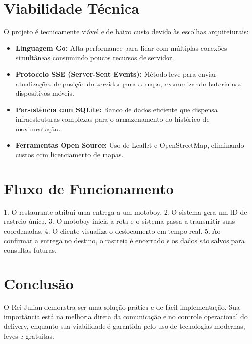 \documentclass[12pt,a4paper]{article}
\begin{document}
\section{Viabilidade Técnica}
O projeto é tecnicamente viável e de baixo custo devido às escolhas arquiteturais:
\begin{itemize}
    \item \textbf{Linguagem Go:} Alta performance para lidar com múltiplas conexões simultâneas consumindo poucos recursos de servidor.
    \item \textbf{Protocolo SSE (Server-Sent Events):} Método leve para enviar atualizações de posição do servidor para o mapa, economizando bateria nos dispositivos móveis.
    \item \textbf{Persistência com SQLite:} Banco de dados eficiente que dispensa infraestruturas complexas para o armazenamento do histórico de movimentação.
    \item \textbf{Ferramentas Open Source:} Uso de Leaflet e OpenStreetMap, eliminando custos com licenciamento de mapas.
\end{itemize}

\section{Fluxo de Funcionamento}
1. O restaurante atribui uma entrega a um motoboy. 2. O sistema gera um ID de rastreio único. 3. O motoboy inicia a rota e o sistema passa a transmitir suas coordenadas. 4. O cliente visualiza o deslocamento em tempo real. 5. Ao confirmar a entrega no destino, o rastreio é encerrado e os dados são salvos para consultas futuras.

\section{Conclusão}
O Rei Julian demonstra ser uma solução prática e de fácil implementação. Sua importância está na melhoria direta da comunicação e no controle operacional do delivery, enquanto sua viabilidade é garantida pelo uso de tecnologias modernas, leves e gratuitas.
\end{document}
